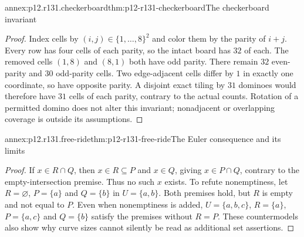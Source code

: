 \begin{annexitem}{annex:p12.r131.checkerboard}{thm:p12-r131-checkerboard}{The checkerboard invariant}
\begin{proof}
Index cells by $(i,j)\in\{1,\ldots,8\}^2$ and color them by
the parity of $i+j$. Every row has four cells of each parity, so
the intact board has $32$ of each. The removed cells $(1,8)$ and
$(8,1)$ both have odd parity. There remain $32$ even-parity and $30$
odd-parity cells. Two edge-adjacent cells differ by $1$ in exactly one
coordinate, so have opposite parity. A disjoint exact tiling by $31$
dominoes would therefore have $31$ cells of each parity, contrary to
the actual counts. Rotation of a permitted domino does not alter
this invariant; nonadjacent or overlapping coverage is outside its
assumptions.
\end{proof}
\end{annexitem}

\begin{annexitem}{annex:p12.r131.free-ride}{thm:p12-r131-free-ride}{The Euler consequence and its limits}
\begin{proof}
If $x\in R\cap Q$, then $x\in R\subseteq P$ and $x\in Q$,
giving $x\in P\cap Q$, contrary to the empty-intersection premise.
Thus no such $x$ exists. To refute nonemptiness, let $R=\varnothing$,
$P=\{a\}$ and $Q=\{b\}$ in $U=\{a,b\}$. Both premises hold,
but $R$ is empty and not equal to $P$. Even when nonemptiness is added,
$U=\{a,b,c\}$, $R=\{a\}$, $P=\{a,c\}$ and $Q=\{b\}$
satisfy the premises without $R=P$. These countermodels also show
why curve sizes cannot silently be read as additional set assertions.
\end{proof}
\end{annexitem}

